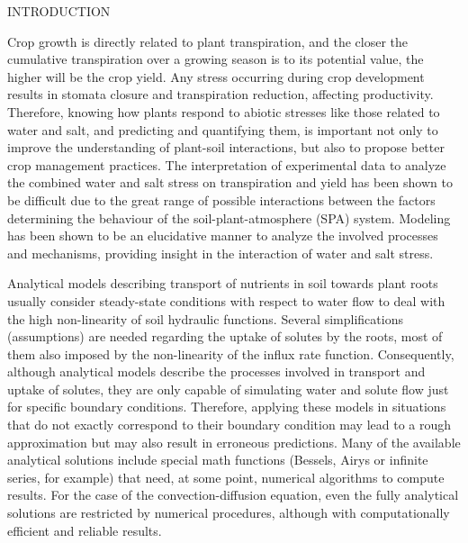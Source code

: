 \cleardoublepage

\def\quic{Quirijn's COMMENT: }

\chap INTRODUCTION

Crop growth is directly related to plant transpiration, and the closer the cumulative transpiration over a growing season is to its potential value, the higher will be the crop yield. 
Any stress occurring during crop development results in stomata closure and transpiration reduction, affecting productivity. 
Therefore, knowing how plants respond to abiotic stresses like those related to water and salt, and predicting and quantifying them, is important not only to improve the understanding of plant-soil interactions, but also to propose better crop management practices.
The interpretation of experimental data to analyze the combined water and salt stress on transpiration and yield has been shown to be difficult due to the great range of possible interactions between the factors determining the behaviour of the soil-plant-atmosphere (SPA) system.
Modeling has been shown to be an elucidative manner to analyze the involved processes and mechanisms, providing insight in the interaction of water and salt stress.

Analytical models describing transport of nutrients in soil towards plant roots usually consider steady-state conditions with respect to water flow to deal with the high non-linearity of soil hydraulic functions. 
Several simplifications (assumptions) are needed regarding the uptake of solutes by the roots, most of them also imposed by the non-linearity of the influx rate function. 
Consequently, although analytical models describe the processes involved in transport and uptake of solutes, they are only capable of simulating water and solute flow just for specific boundary conditions.
Therefore, applying these models in situations that do not exactly correspond to their boundary condition may lead to a rough approximation but may also result in erroneous predictions.
Many of the available analytical solutions include special math functions (Bessels, Airys or infinite series, for example) that need, at some point, numerical algorithms to compute results.
For the case of the convection-diffusion equation, even the fully analytical solutions are restricted by numerical procedures, although with computationally efficient and reliable results.

